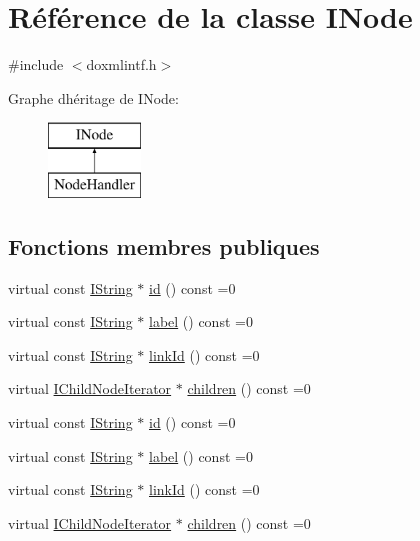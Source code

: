 \hypertarget{class_i_node}{}\section{Référence de la classe I\+Node}
\label{class_i_node}


{\ttfamily \#include $<$doxmlintf.\+h$>$}

Graphe d\textquotesingle{}héritage de I\+Node\+:\begin{figure}[H]
\begin{center}
\leavevmode
\includegraphics[height=2.000000cm]{class_i_node}
\end{center}
\end{figure}
\subsection*{Fonctions membres publiques}
\begin{DoxyCompactItemize}
\item 
virtual const \hyperlink{class_i_string}{I\+String} $\ast$ \hyperlink{class_i_node_a46ed6071ae736ba58f3df2ec7ddf9de4}{id} () const  =0
\item 
virtual const \hyperlink{class_i_string}{I\+String} $\ast$ \hyperlink{class_i_node_a8f9e1cecb987e033cca10a57a93961a9}{label} () const  =0
\item 
virtual const \hyperlink{class_i_string}{I\+String} $\ast$ \hyperlink{class_i_node_aebe55897841a9fe2959c0ea97e048809}{link\+Id} () const  =0
\item 
virtual \hyperlink{class_i_child_node_iterator}{I\+Child\+Node\+Iterator} $\ast$ \hyperlink{class_i_node_aa3cc46114d0256932cf9ae4dbd017e8d}{children} () const  =0
\item 
virtual const \hyperlink{class_i_string}{I\+String} $\ast$ \hyperlink{class_i_node_a46ed6071ae736ba58f3df2ec7ddf9de4}{id} () const  =0
\item 
virtual const \hyperlink{class_i_string}{I\+String} $\ast$ \hyperlink{class_i_node_a8f9e1cecb987e033cca10a57a93961a9}{label} () const  =0
\item 
virtual const \hyperlink{class_i_string}{I\+String} $\ast$ \hyperlink{class_i_node_aebe55897841a9fe2959c0ea97e048809}{link\+Id} () const  =0
\item 
virtual \hyperlink{class_i_child_node_iterator}{I\+Child\+Node\+Iterator} $\ast$ \hyperlink{class_i_node_aa3cc46114d0256932cf9ae4dbd017e8d}{children} () const  =0
\end{DoxyCompactItemize}


